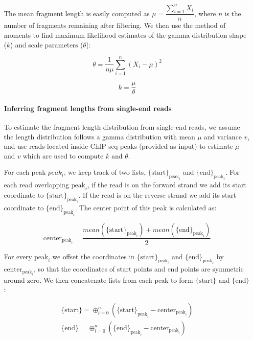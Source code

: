\documentclass[12pt]{article}
\begin{document}
The mean fragment length is easily computed as $\mu = \dfrac{\sum_{i=1}^{n}X_i}{n}$, where $n$ is the number of fragments remaining after filtering. We then use the method of moments to find maximum likelihood estimates of the gamma distribution shape ($k$) and scale parameters ($\theta$):

\begin{equation}
  \theta = \dfrac{1}{n\mu}\sum_{i=1}^{n}(X_i - \mu)^2
\end{equation}

\begin{equation}
  k =  \dfrac{\mu}{\theta}
\end{equation}

\paragraph{Inferring fragment lengths from single-end reads}
To estimate the fragment length distribution from single-end reads, we assume the length distribution follows a gamma distribution with mean $\mu$ and variance $v$, and use reads located inside ChIP-seq peaks (provided as input) to estimate $\mu$ and $v$ which are used to compute $k$ and $\theta$.

For each peak $peak_i$, we keep track of two lists, $\{\text{start}\}_{\text{peak}_i}$ and $\{\text{end}\}_{\text{peak}_i}$.
For each read overlapping $\text{peak}_i$, if the read is on the forward strand we add its start coordinate to $\{\text{start}\}_{\text{peak}_i}$.
If the read is on the reverse strand we add its start coordinate to $\{\text{end}\}_{\text{peak}_i}$.
The center point of this peak is calculated as:

\begin{equation} \label{eq:center}
  \text{center}_{\text{peak}_i} = \frac{mean(\{\text{start}\}_{\text{peak}_i}) + mean(\{\text{end}\}_{\text{peak}_i})}{2}
\end{equation}
  
For every $\text{peak}_i$ we offset the coordinates in $\{\text{start}\}_{\text{peak}_i}$ and $\{\text{end}\}_{\text{peak}_i}$ by $\text{center}_{\text{peak}_i}$, so that the coordinates of start points and end points are symmetric around zero.
We then concatenate lists from each peak to form $\{\text{start}\}$ and $\{\text{end}\}$:

\begin{equation} \label{eq:concat}
  \begin{array}{c}
  \{\text{start}\} = \oplus_{i=0}^{n} (\{\text{start}\}_{\text{peak}_i} - \text{center}_{\text{peak}_i})\\
  \{\text{end}\} = \oplus_{i=0}^{n} (\{\text{end}\}_{\text{peak}_i} - \text{center}_{\text{peak}_i})
  \end{array}
\end{equation}
\end{document}
